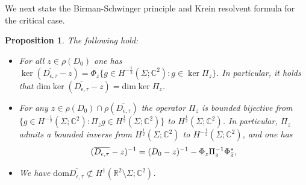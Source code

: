 \documentclass[11pt,a4paper,reqno,oneside]{amsproc}
\DeclareMathOperator{\dom}{dom}
\def \rr {{\mathbb R}}
\def \cc {{\mathbb C}}
\numberwithin{equation}{section}
\def\dom{\mathrm{dom}}
\def \cc {{\mathbb{C}}}
\newtheorem{proposition}[definition]{Proposition}
\begin{document}
We next state the Birman-Schwinger principle and Krein resolvent formula for the critical case.

\begin{proposition}\label{BS and Krein 2}  The following hold:
\begin{itemize}
\item[(i)] For all $z\in\rho(D_0)$ one has $\ker (\overline{D_{\epsilon,\tau}}-z)=\Phi_z\{ g\in H^{-\frac{1}{2}}(\Sigma;\cc^2): g\in\ker \Pi_z\}$. In particular, it holds that $\mathrm{dim}\ker (\overline{D_{\epsilon,\tau}}-z)=\mathrm{dim}\ker \Pi_z$.
\item[(ii)]  For any $z\in\rho(D_0)\cap\rho(\overline{D_{\epsilon,\tau}})$ the operator $\Pi_z$ is bounded bijective from $\{ g\in H^{-\frac{1}{2}}(\Sigma;\cc^2): \Pi_z g\in H^{\frac{1}{2}}(\Sigma;\cc^2)\}$ to $H^{\frac{1}{2}}(\Sigma;\cc^2)$. In particular, $\Pi_z$ admits a bounded inverse from $H^{\frac{1}{2}}(\Sigma;\cc^2)$ to $H^{-\frac{1}{2}}(\Sigma;\cc^2)$, and  one has 
\begin{equation}\label{Krein2}
				(\overline{D_{\epsilon, \tau}} - z)^{-1} = (D_0 - z)^{-1} - \Phi_{z} \Pi_{z}^{-1} \Phi_{\Bar{z}}^*,
\end{equation}	
\item[(iii)] We have  $\dom \overline{D_{\epsilon, \tau}} \not\subset H^1(\rr^2\setminus\Sigma;\cc^2)$.
\end{itemize}
\end{proposition}
\end{document}
